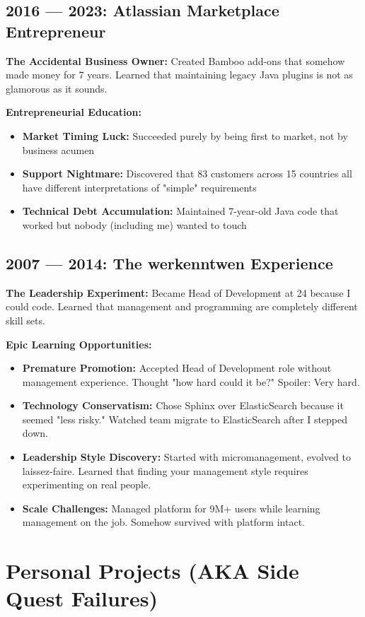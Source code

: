 \documentclass[10pt,a4paper]{article}
\begin{document}
\subsection{2016 — 2023: Atlassian Marketplace Entrepreneur}
\textbf{The Accidental Business Owner:} Created Bamboo add-ons that somehow made money for 7 years. Learned that maintaining legacy Java plugins is not as glamorous as it sounds.

\textbf{Entrepreneurial Education:}
\begin{itemize}[leftmargin=1em, itemsep=0.2em]
\item \textbf{Market Timing Luck:} Succeeded purely by being first to market, not by business acumen
\item \textbf{Support Nightmare:} Discovered that 83 customers across 15 countries all have different interpretations of "simple" requirements
\item \textbf{Technical Debt Accumulation:} Maintained 7-year-old Java code that worked but nobody (including me) wanted to touch
\end{itemize}

\subsection{2007 — 2014: The werkenntwen Experience}
\textbf{The Leadership Experiment:} Became Head of Development at 24 because I could code. Learned that management and programming are completely different skill sets.

\textbf{Epic Learning Opportunities:}
\begin{itemize}[leftmargin=1em, itemsep=0.2em]
\item \textbf{Premature Promotion:} Accepted Head of Development role without management experience. Thought "how hard could it be?" Spoiler: Very hard.
\item \textbf{Technology Conservatism:} Chose Sphinx over ElasticSearch because it seemed "less risky." Watched team migrate to ElasticSearch after I stepped down.
\item \textbf{Leadership Style Discovery:} Started with micromanagement, evolved to laissez-faire. Learned that finding your management style requires experimenting on real people.
\item \textbf{Scale Challenges:} Managed platform for 9M+ users while learning management on the job. Somehow survived with platform intact.
\end{itemize}

\section{Personal Projects (AKA Side Quest Failures)}
\end{document}
